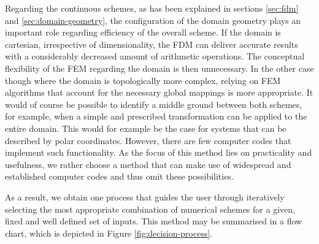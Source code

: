 \documentclass[sn-mathphys,Numbered]{sn-jnl}%
\theoremstyle{thmstyleone}%
\theoremstyle{thmstyletwo}%
\theoremstyle{thmstylethree}%
\begin{document}
Regarding the continuous schemes, as has been explained in sections \ref{sec:fdm} and \ref{sec:domain-geometry}, the configuration of the domain geometry plays an important role regarding efficiency of the overall scheme.
If the domain is cartesian, irrespective of dimensionality, the FDM can deliver accurate results with a considerably decreased amount of arithmetic operations.
The conceptual flexibility of the FEM regarding the domain is then unnecessary.
In the other case though where the domain is topologically more complex, relying on FEM algorithms that account for the necessary global mappings is more appropriate.
It would of course be possible to identify a middle ground between both schemes, for example, when a simple and prescribed transformation can be applied to the entire domain.
This would for example be the case for systems that can be described by polar coordinates.
However, there are few computer codes that implement such functionality.
As the focus of this method lies on practicality and usefulness, we rather choose a method that can make use of widespread and established computer codes and thus omit these possibilities.

As a result, we obtain one process that guides the user through iteratively selecting the most appropriate combination of numerical schemes for a given, fixed and well defined set of inputs.
This method may be summarised in a flow chart, which is depicted in Figure \ref{fig:decision-process}.
\end{document}

